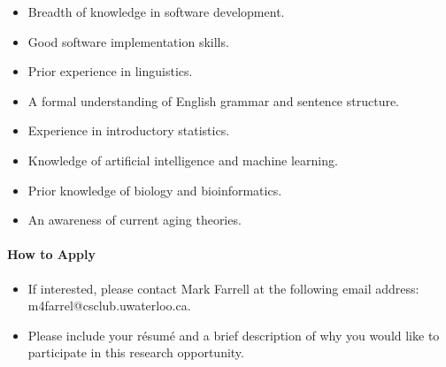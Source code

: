 \documentclass[10pt, a4paper, notitlepage]{article}
\begin{document}
\begin{itemize}
\item Breadth of knowledge in software development.
\item Good software implementation skills.
\newline
\item Prior experience in linguistics.
\item A formal understanding of English grammar and sentence structure.
\newline
\item Experience in introductory statistics.
\item Knowledge of artificial intelligence and machine learning.
\newline
\item Prior knowledge of biology and bioinformatics.
\item An awareness of current aging theories.

\end{itemize}

\paragraph{How to Apply}

\begin{itemize}

\item If interested, please contact Mark Farrell at the following email address: m4farrel@csclub.uwaterloo.ca.
\item Please include your résumé and a brief description of why you would like to participate
in this research opportunity.

\end{itemize}
\end{document}
